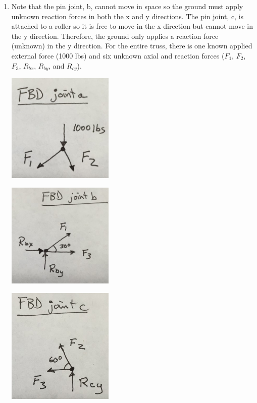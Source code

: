 \begin{sol}
\begin{enumerate}
    \item     Note that the pin joint, b, cannot move in space so the ground must apply unknown reaction forces in both the x and y directions. The pin joint, c, is attached to a roller so it is free to move in the x direction but cannot move in the y direction. Therefore, the ground only applies a reaction force (unknown) in the y direction. For the entire truss, there is one known applied external force (1000 lbs) and six unknown axial and reaction forces ($F_1$, $F_2$, $F_3$, $R_{bx}$, $R_{by}$, and $R_{cy}$).
    \begin{center}
        \includegraphics[width=2in]{FacesNight4/figs/trianglea.jpg}
    \end{center}
    \begin{center}
        \includegraphics[width=2in]{FacesNight4/figs/triangleb.jpg}
    \end{center}
    \begin{center}
        \includegraphics[width=2in]{FacesNight4/figs/trianglec.jpg}
	    \end{center}
	    

\end{enumerate}
\end{sol}
